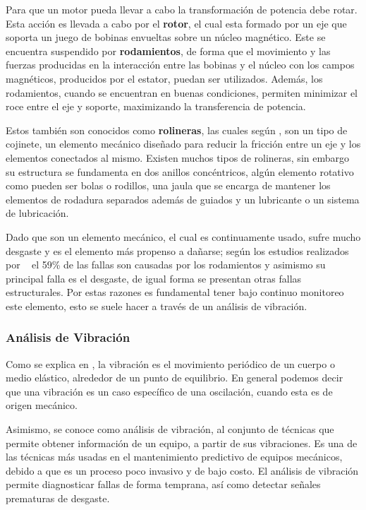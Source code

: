 Para que un motor pueda llevar a cabo la transformación de potencia debe rotar.
Esta acción es llevada a cabo por el \textbf{rotor}, el cual esta formado por un
eje que soporta un juego de bobinas envueltas sobre un núcleo magnético. Este
se encuentra suspendido por \textbf{rodamientos}, de forma que el movimiento y
las fuerzas producidas en la interacción entre las bobinas y el núcleo con los
campos magnéticos, producidos por el estator, puedan ser utilizados. Además,
los rodamientos, cuando se encuentran en buenas condiciones, permiten minimizar
el roce entre el eje y soporte, maximizando la transferencia de potencia.

Estos también son conocidos como \textbf{rolineras}, las cuales según
\textcite{rodamiento},  son un tipo de cojinete,
un elemento mecánico diseñado para reducir la fricción entre un eje y los
elementos conectados al mismo. Existen muchos tipos de rolineras, sin embargo
su estructura se fundamenta en dos anillos concéntricos, algún elemento rotativo
como pueden ser bolas o rodillos, una jaula que se encarga de mantener los
elementos de rodadura separados además de guiados y un lubricante o un sistema
de lubricación.

Dado que son un elemento mecánico, el cual es continuamente usado, sufre mucho
desgaste y es el elemento más propenso a dañarse; según los estudios realizados
por ~\textcite{Kammermann} el 59\% de las fallas son causadas por los rodamientos
y asimismo su principal falla es el desgaste, de igual forma se presentan
otras fallas estructurales. Por estas razones es fundamental tener bajo continuo
monitoreo este elemento, esto se suele hacer a través de un análisis de vibración.


\subsubsection{Análisis de Vibración}

Como se explica en \textcite{wiki:Vibration}, la vibración es el  movimiento
periódico de un cuerpo o medio
elástico, alrededor de un punto de equilibrio. En general podemos decir que una
vibración es un caso específico de una oscilación, cuando esta es de origen
mecánico.

Asimismo, se conoce como análisis de vibración, al conjunto de técnicas que permite
obtener información de un equipo, a partir de sus vibraciones. Es una de las
técnicas más usadas en el mantenimiento predictivo de equipos mecánicos, debido
a que es un proceso poco invasivo y de bajo costo. El análisis de vibración
permite diagnosticar fallas de forma temprana, así como detectar señales
prematuras de desgaste.


